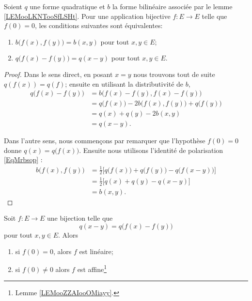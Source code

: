 \begin{lemma}   \label{LemewGJmM}
    Soient \( q\) une forme quadratique et \( b\) la forme bilinéaire associée par le lemme \ref{LEMooLKNTooSfLSHt}.  Pour une application bijective \( f\colon E\to E\) telle que \( f(0)=0\), les conditions suivantes sont équivalentes: 
    \begin{enumerate}
        \item
            \( b\big( f(x),f(y) \big)=b(x,y)\) pour tout \( x,y\in E\);
        \item
            \( q\big( f(x)-f(y) \big)=q(x-y)\) pour tout \( x,y\in E\).
    \end{enumerate}
\end{lemma}

\begin{proof}
    Dans le sens direct, en posant \( x=y\) nous trouvons tout de suite \( q(f(x))=q(f)\); ensuite en utilisant la distributivité de \( b\),
    \begin{subequations}
        \begin{align}
            q\big( f(x)-f(y) \big)&=b\big( f(x)-f(y),f(x)-f(y) \big)\\
            &=q\big( f(x) \big)-2b\big( f(x),f(y) \big)+q\big( f(y) \big)\\
            &=q(x)+q(y)-2b(x,y)\\
            &=q(x-y).
        \end{align}
    \end{subequations}
    
    Dans l'autre sens, nous commençons par remarquer que l'hypothèse \( f(0)=0\) donne \( q(x)=q\big( f(x) \big)\). Ensuite nous utilisons l'identité de polarisation \eqref{EqMrbsop} :
    \begin{subequations}
        \begin{align}
            b\big( f(x),f(y) \big)&=\frac{ 1 }{2}\big[ q\big( f(x) \big)+q\big( f(y) \big)-q\big( f(x-y) \big) \big]\\
            &=\frac{ 1 }{2}\big[ q(x)+q(y)-q(x-y) \big]\\
            &=b(x,y).
        \end{align}
    \end{subequations}
\end{proof}

\begin{theorem}     \label{ThoDsFErq}
    Soit \( f\colon E\to E\) une bijection telle que
    \begin{equation}
        q(x-y)=q\big( f(x)-f(y) \big)
    \end{equation}
    pour tout \( x,y\in E\). Alors
    \begin{enumerate}
        \item
            si \( f(0)=0\), alors \( f\) est linéaire;
        \item
            si \( f(0)\neq 0\) alors \( f\) est affine\footnote{Lemme \ref{LEMooZZAIooOMiayy}.}
    \end{enumerate}
\end{theorem}

